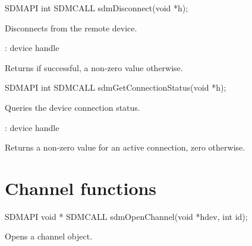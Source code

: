 \documentclass[a4paper,12pt,twoside,extrafontsizes]{memoir}
\begin{document}

\begin{cfuncprototype}
SDMAPI int SDMCALL sdmDisconnect(void *h);
\end{cfuncprototype}

\begin{funcdescr}
	Disconnects from the remote device.
\end{funcdescr}

\begin{funcparams}
	: device handle
\end{funcparams}

\begin{funcret}
	Returns  if successful, a non-zero value otherwise.
\end{funcret}



\begin{cfuncprototype}
SDMAPI int SDMCALL sdmGetConnectionStatus(void *h);
\end{cfuncprototype}

\begin{funcdescr}
	Queries the device connection status.
\end{funcdescr}

\begin{funcparams}
	: device handle
\end{funcparams}

\begin{funcret}
	Returns a non-zero value for an active connection, zero otherwise.
\end{funcret}

\section{Channel functions}
\label{sec:channelfunctions}



\begin{cfuncprototype}
SDMAPI void * SDMCALL sdmOpenChannel(void *hdev, int id);
\end{cfuncprototype}

\begin{funcdescr}
	Opens a channel object.
\end{funcdescr}
\end{document}
